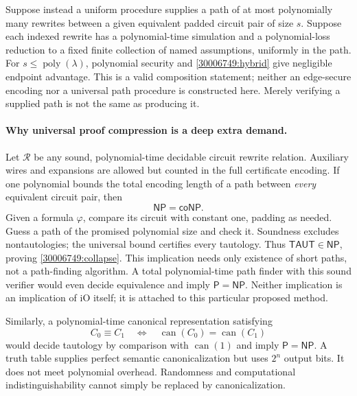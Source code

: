 \documentclass[11pt,a4paper]{article}
\numberwithin{equation}{section}
\begin{document}
Suppose instead a uniform procedure supplies a path of at most polynomially
many rewrites between a given equivalent padded circuit pair of size $s$.
Suppose each indexed rewrite has a polynomial-time simulation and a
polynomial-loss reduction to a fixed finite collection of named assumptions,
uniformly in the path. For $s\le\operatorname{poly}(\lambda)$, polynomial
security and \eqref{30006749:hybrid} give negligible endpoint advantage.
This is a valid composition statement; neither an edge-secure encoding nor
a universal path procedure is constructed here. Merely verifying a supplied
path is not the same as producing it.

\paragraph{Why universal proof compression is a deep extra demand.}
Let $\mathcal R$ be any sound, polynomial-time decidable circuit rewrite
relation. Auxiliary wires and expansions are allowed but counted in the
full certificate encoding. If one polynomial bounds the total encoding
length of a path between \emph{every} equivalent circuit pair, then
\begin{equation}\label{30006749:collapse}
 \mathsf{NP}=\mathsf{coNP}.
\end{equation}
Given a formula $\varphi$, compare its circuit with constant one, padding
as needed. Guess a path of the promised polynomial size and check it.
Soundness excludes nontautologies; the universal bound certifies every
tautology. Thus $\mathsf{TAUT}\in\mathsf{NP}$, proving
\eqref{30006749:collapse}. This implication needs only existence of short paths,
not a path-finding algorithm. A total polynomial-time path finder with this
sound verifier would even decide equivalence and imply
$\mathsf P=\mathsf{NP}$. Neither implication is an implication of iO itself;
it is attached to this particular proposed method.

Similarly, a polynomial-time canonical representation satisfying
\[
 C_0\equiv C_1\quad\Longleftrightarrow\quad
 \operatorname{can}(C_0)=\operatorname{can}(C_1)
\]
would decide tautology by comparison with $\operatorname{can}(1)$ and imply
$\mathsf P=\mathsf{NP}$. A truth table supplies perfect semantic
canonicalization but uses $2^n$ output bits. It does not meet polynomial
overhead. Randomness and computational indistinguishability cannot simply
be replaced by canonicalization.
\end{document}
